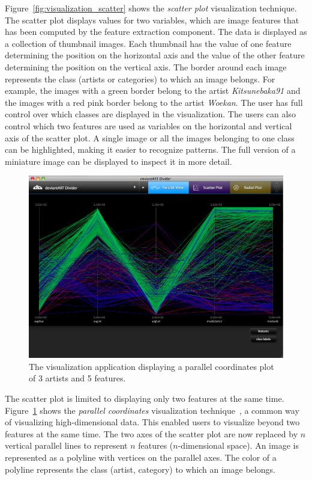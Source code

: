 Figure~\ref{fig:visualization_scatter} shows the \textit{scatter plot} visualization technique.
The scatter plot displays values for two variables, which are image features that has been computed by the feature extraction component.
The data is displayed as a collection of thumbnail images.
Each thumbnail has the value of one feature determining the position on the horizontal axis and the value of the other feature determining the position on the vertical axis.
The border around each image represents the class (artists or categories) to which an image belongs.
For example, the images with a green border belong to the artist \textit{Kitsunebaka91} and the images with a red pink border belong to the artist \textit{Woekan}.
The user has full control over which classes are displayed in the visualization.
The users can also control which two features are used as variables on the horizontal and vertical axis of the scatter plot.
A single image or all the images belonging to one class can be highlighted, making it easier to recognize patterns.
The full version of a miniature image can be displayed to inspect it in more detail.

\begin{figure}[htb]
  \centering
  \includegraphics[width=1\linewidth]{img/visualization_parallel.png}
  \caption{The visualization application displaying a parallel coordinates plot of 3 artists and 5 features.}
  \label{fig:visualization_parallel}
\end{figure}

The scatter plot is limited to displaying only two features at the same time.
Figure~\ref{fig:visualization_parallel} shows the \textit{parallel coordinates} visualization technique~\cite{andrienko2001constructing}, a common way of visualizing high-dimensional data.
This enabled users to visualize beyond two features at the same time.
The two axes of the scatter plot are now replaced by $n$ vertical parallel lines to represent $n$ features ($n$-dimensional space).
An image is represented as a polyline with vertices on the parallel axes.
The color of a polyline represents the class (artist, category) to which an image belongs.

